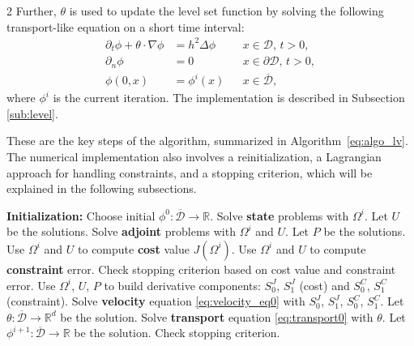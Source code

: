 \documentclass[a4paper, oneside]{article}
\newcommand{\Om}{\Omega}
\newcommand{\VV}{\theta}
\newcommand{\tred}{\textcolor{red}}
\begin{document}
\begin{multicols}{2}
Further, $\VV$ is used to update
the level set function by solving the following transport-like equation on a short time interval:
\begin{equation} \label{eq:transport0}
	\begin{aligned}
	\partial_t \phi+\theta\cdot\nabla\phi &= h^2\Delta\phi && x\in \mathcal{D},\, t>0, \\
						\partial_{n} \phi &= 0 && x\in \partial\mathcal{D},\, t>0, \\
							   \phi(0, x) &= \phi^{i}(x) && x\in \overline{\mathcal{D}},
	\end{aligned}
	\end{equation}
	where $\phi^{i}$ is the current iteration.
	The implementation is described in Subsection \ref{sub:level}.

	These are the key steps of the algorithm, summarized in Algorithm~\ref{eq:algo_lv}.
The numerical implementation also involves a reinitialization, a Lagrangian approach for handling constraints, and a stopping criterion, which
will be explained in the following subsections.


\begin{algorithm}[H] 
\caption{Level set algorithm} \label{eq:algo_lv}
\small
\begin{algorithmic}[1]
\State \textbf{Initialization:} Choose initial $\phi^0:\overline{\mathcal{D}} \rightarrow \mathds{R}$.
	\State Solve \textbf{state} problems with $\Omega^i$.
	\Statex \hspace{3em} Let $U$ be the solutions.
    \State Solve  \textbf{adjoint} problems with $\Omega^i$ and $U$.
	\Statex \hspace{3em} Let $P$ be the solutions.
	\State Use $\Omega^i$ and $U$ to compute \textbf{cost} value $J(\Om^i)$.
	\State Use $\Omega^i$ and $U$ to compute \textbf{constraint} error.
	\State Check stopping criterion based on cost value and constraint error.
	\State Use $\Omega^i$, $U$, $P$ to build derivative components:
	\Statex \hspace{1.2em} $S_0^{J}$, $S_1^{J}$ (cost) and $S_0^{C}$, $S_1^{C}$ (constraint).
	\State Solve \textbf{velocity} equation \eqref{eq:velocity_eq0} with $S_0^{J}$, $S_1^{J}$, $S_0^{C}$, $S_1^{C}$.
	\Statex \hspace{3em} Let $\theta:\overline{\mathcal{D}} \rightarrow \mathds{R}^d$ be the solution.
	\State Solve \textbf{transport} equation \eqref{eq:transport0} with $\theta$.
	\Statex \hspace{3em} Let $\phi^{i+1}:\overline{\mathcal{D}} \rightarrow \mathds{R}$ be the solution.
	\State Check stopping criterion.
\EndFor
\end{algorithmic}
\end{algorithm}


\end{multicols}
\end{document}
